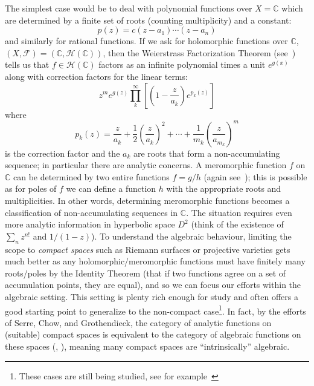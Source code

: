 \documentclass{book}
\newcommand{\C}{{\mathbb{C}}}
\newcommand{\CM}{{\mathcal{M}}}
\newcommand{\CF}{{\mathcal{F}}}
\newcommand{\CH}{{\mathcal{H}}}
\newcommand{\CO}{{\mathcal{O}}}
\begin{document}
The simplest case would be to deal with polynomial functions over $X = \C$ which are determined by a finite
set of roots (counting multiplicity) and a constant:
\[
  p(z) = c(z-a_1)\cdots (z-a_n)
\]
and similarly for rational functions.
If we ask for holomorphic
functions over $\C$, $(X,\CF) = (\C, \CH(\C))$, then the Weierstrass Factorization Theorem
(see~\cite[section~4.2]{NateComplexAnalysis}) tells us that $f \in \CH(\C)$ factors as an infinite polynomial
times a unit $e^{g(x)}$ along with correction factors for the linear terms:
\[
  z^m e^{g(z)}\prod_k^\infty \left[ \left( 1- \frac{z}{a_k} \right)e^{p_k(z)} \right]
\]
where
\[
  p_k(z) =  \frac{z}{a_k} + \frac{1}{2} \left( \frac{z}{a_k} \right)^2 + \cdots + \frac{1}{m_k} \left( \frac{z}{a_{m_k}} \right)^m
\]
is the correction factor and the $a_k$ are roots that form a non-accumulating sequence; in particular there are analytic concerns.
A meromorphic function $f$ on $\C$ can be determined by two entire functions $f = g/h$ (again
see~\cite[section~4.2]{NateComplexAnalysis}); this is possible as for poles of $f$ we can define a function $h$ with the
appropriate roots and multiplicities. In other words, determining meromorphic functions becomes
a classification of non-accumulating sequences in $\C$. The situation requires even more analytic information in hyperbolic
space $D^2$ (think of the existence of $\sum_n z^{n!}$ and $1/(1-z)$). To understand the algebraic behaviour, limiting the scope to
\emph{compact spaces} such as Riemann surfaces or projective varieties gets much better as any holomorphic/meromorphic
functions must have finitely many roots/poles by the Identity Theorem (that if two functions agree on a set
of accumulation points, they are equal), and so we can focus our efforts within the algebraic setting. This
setting is plenty rich enough for study and often offers a good starting point to generalize to the
non-compact case\footnote{These cases are still being studied, see for
example~\cite{montpletRiemannRochIsometriesNoncompact2016}}. In fact, by the efforts of Serre, Chow, and Grothendieck, the category of analytic
functions on (suitable) compact spaces is equivalent to the category of algebraic functions on these spaces
(\cite{hallGAGATheorems2022}, \cite{chowCompactComplexAnalytic1949}),
meaning many compact spaces are ``intrinsically'' algebraic.
\end{document}
